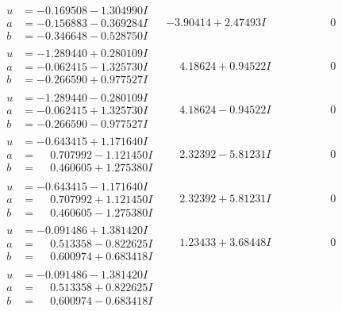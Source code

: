 \documentclass[1p]{elsarticle_modified}
\theoremstyle{definition}
\begin{document}
$$\begin{array}{c|c|c}
 \hline 
\begin{aligned}
u &= -0.169508 - 1.304990 I \\
a &= -0.156883 - 0.369284 I \\
b &= -0.346648 - 0.528750 I\end{aligned}
 & -3.90414 + 2.47493 I & \phantom{-0.000000 } 0 \\ \hline\begin{aligned}
u &= -1.289440 + 0.280109 I \\
a &= -0.062415 - 1.325730 I \\
b &= -0.266590 + 0.977527 I\end{aligned}
 & \phantom{-}4.18624 + 0.94522 I & \phantom{-0.000000 } 0 \\ \hline\begin{aligned}
u &= -1.289440 - 0.280109 I \\
a &= -0.062415 + 1.325730 I \\
b &= -0.266590 - 0.977527 I\end{aligned}
 & \phantom{-}4.18624 - 0.94522 I & \phantom{-0.000000 } 0 \\ \hline\begin{aligned}
u &= -0.643415 + 1.171640 I \\
a &= \phantom{-}0.707992 - 1.121450 I \\
b &= \phantom{-}0.460605 + 1.275380 I\end{aligned}
 & \phantom{-}2.32392 - 5.81231 I & \phantom{-0.000000 } 0 \\ \hline\begin{aligned}
u &= -0.643415 - 1.171640 I \\
a &= \phantom{-}0.707992 + 1.121450 I \\
b &= \phantom{-}0.460605 - 1.275380 I\end{aligned}
 & \phantom{-}2.32392 + 5.81231 I & \phantom{-0.000000 } 0 \\ \hline\begin{aligned}
u &= -0.091486 + 1.381420 I \\
a &= \phantom{-}0.513358 - 0.822625 I \\
b &= \phantom{-}0.600974 + 0.683418 I\end{aligned}
 & \phantom{-}1.23433 + 3.68448 I & \phantom{-0.000000 } 0 \\ \hline\begin{aligned}
u &= -0.091486 - 1.381420 I \\
a &= \phantom{-}0.513358 + 0.822625 I \\
b &= \phantom{-}0.600974 - 0.683418 I\end{aligned}

\end{array}$$
\end{document}

